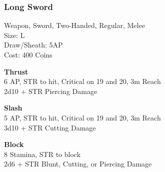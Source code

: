 \subsubsection{Long Sword}\label{weapon:longSword}
Weapon, Sword, Two-Handed, Regular, Melee\\
Size: L\\
Draw/Sheath: 5AP\\
Cost: 400 Coins

\textbf{Thrust}\\
6 AP, STR to hit, Critical on 19 and 20, 3m Reach\\
2d10 + \texttimes STR Piercing Damage

\textbf{Slash}\\
5 AP, STR to hit, Critical on 19 and 20, 3m Reach\\
3d10 + \texttimes STR Cutting Damage

\textbf{Block}\\
8 Stamina, STR to block\\
2d6 + \texttimes STR Blunt, Cutting, or Piercing Damage